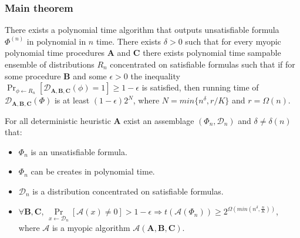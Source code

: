 \begin{frame}
	\frametitle{Main theorem}
	\pause
    \begin{theorem} \label{main}
	There exists a polynomial time algorithm that outputs
unsatisfiable formula $\Phi^{(n)}$ in polynomial in $n$ time. There
exists $\delta>0$ such that for every myopic polynomial time
procedures $\mathbf{A}$ and $\mathbf{C}$ there exists
polynomial time sampable ensemble of distributions $R_n$ concentrated
on satisfiable formulas such that if for some procedure
$\mathbf{B}$ and some $\epsilon>0$ the inequality
$\Pr_{\phi\gets R_n}[\mathcal{D}_{\mathbf{A},\mathbf{B},\mathbf{C}}(\phi)=1]\ge 1-\epsilon$
is satisfied, then running time of
$\mathcal{D}_{\mathbf{A},\mathbf{B},\mathbf{C}}(\Phi)$ is at least
$(1-\epsilon)2^N$, where $N=min\{n^\delta, r/K\}$ and $r=\Omega(n)$.
\end{theorem}
	\begin{theorem}
        For all deterministic heuristic $\mathbf{A}$
        exist an assemblage $(\Phi_n, \mathcal{D}_n)$ and $\delta \ne
        \delta(n)$ that:
        \pause
		\begin{itemize}
            \item $\Phi_n$ is an unsatisfiable formula.
        	\item $\Phi_n$ can be creates in polynomial time.
            \pause
            \item $\mathcal{D}_n$ is a distribution concentrated on
		        satisfiable formulas.
            \pause
			\item $\forall \mathbf{B}, \mathbf{C}$,
				$\Pr\limits_{x \gets \mathcal{D}_n}[\mathcal{A}(x)
                \ne 0] > 1 - \epsilon \Rightarrow
                t(\mathcal{A}(\Phi_n)) \ge 2^{\Omega(min(n^\delta,
                \frac{n}{K}))}$, where $\mathcal{A}$ is a myopic algorithm
			    $\mathcal{A}(\mathbf{A}, \mathbf{B},\mathbf{C})$.
		\end{itemize}
	\end{theorem}
\end{frame}

